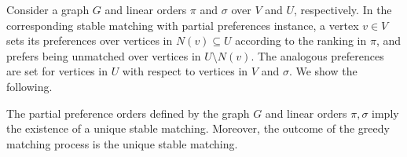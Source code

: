 \documentclass{toc}
\theoremstyle{plain}
\begin{document}
Consider a graph $G$ and linear orders $\pi$ and $\sigma$ over $V$ and $U$, respectively. In the corresponding stable matching with partial preferences instance, a vertex $v\in V$ sets its preferences over vertices in $N(v)\subseteq U$ according to the ranking in $\pi$, and prefers being unmatched over vertices in $U\setminus N(v)$. The analogous preferences are set for vertices in $U$ with respect to vertices in $V$ and $\sigma$. 
%
%
%
%
%
%
%
%
%
%
%
%
%
%
%
%
%
%
%
%
We show the following.

\begin{proposition}
	The partial preference orders defined by the graph $G$ and linear orders $\pi,\sigma$ imply the existence of a unique stable matching. 
	Moreover, the outcome of the greedy matching process is the unique stable matching. 
\end{proposition}
\end{document}
